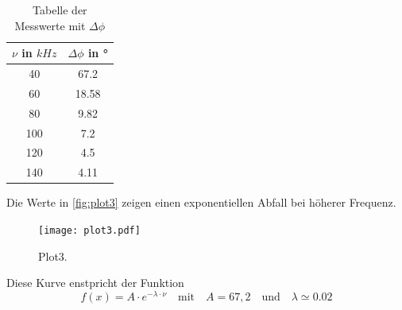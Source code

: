 \begin{table}[htb]
  \centering
  \caption{Tabelle der Messwerte mit \(\Delta\phi\)}
  \label{tab:tab4}
  \begin{tabular}{c c}
    \toprule
    $\nu$ in $kHz$ & $\Delta\phi$ in °\\
    \midrule
    40 & 67.2\\
    60 & 18.58\\
    80 & 9.82\\
    100 & 7.2\\
    120 & 4.5\\
    140 & 4.11\\
    \bottomrule
  \end{tabular}
\end{table}

Die Werte in \autoref{fig:plot3} zeigen einen exponentiellen Abfall bei höherer Frequenz.\\

\begin{figure}[htb]
  \centering
  \texttt{[image: plot3.pdf]}
  \caption{Plot3.}
  \label{fig:plot3}
\end{figure}

Diese Kurve enstpricht der Funktion
\begin{equation}
  f(x) = A\cdot e^{-\lambda\cdot\nu} \quad\textrm{mit}\quad A = 67,2 \quad\textrm{und}\quad \lambda\simeq 0.02
\end{equation}


